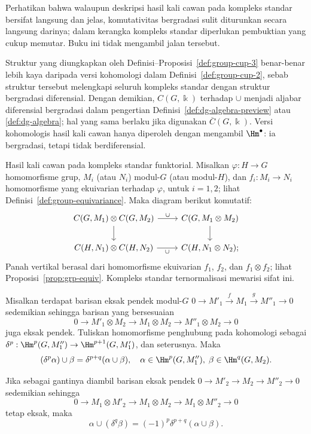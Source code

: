 Perhatikan bahwa walaupun deskripsi hasil kali cawan pada kompleks standar
bersifat langsung dan jelas, komutativitas bergradasi sulit diturunkan secara
langsung darinya; dalam kerangka kompleks standar diperlukan pembuktian yang
cukup memutar. Buku ini tidak mengambil jalan tersebut.

\begin{catatan}
	Struktur yang diungkapkan oleh Definisi--Proposisi~\ref{def:group-cup-3}
	benar-benar lebih kaya daripada versi kohomologi dalam
	Definisi~\ref{def:group-cup-2}, sebab struktur tersebut melengkapi seluruh
	kompleks standar dengan struktur bergradasi diferensial. Dengan demikian,
	$C(G,\Bbbk)$ terhadap $\cup$ menjadi aljabar diferensial bergradasi dalam
	pengertian Definisi~\ref{def:dg-algebra-preview} atau
	\ref{def:dg-algebra}; hal yang sama berlaku jika digunakan
	$\overline{C}(G,\Bbbk)$. Versi kohomologis hasil kali cawan hanya diperoleh
	dengan mengambil $\Hm^\bullet$: ia bergradasi, tetapi tidak berdiferensial.
\end{catatan}

Hasil kali cawan pada kompleks standar funktorial. Misalkan
$\varphi:H\to G$ homomorfisme grup, $M_i$ (atau $N_i$) modul-$G$ (atau
modul-$H$), dan $f_i:M_i\to N_i$ homomorfisme yang ekuivarian terhadap
$\varphi$, untuk $i=1,2$; lihat Definisi~\ref{def:group-equivariance}. Maka
diagram berikut komutatif:
\[\begin{tikzcd}
	C(G, M_1) \otimes C(G, M_2) \arrow[r, "\cup"] \arrow[d] & C(G, M_1 \otimes M_2) \arrow[d] \\
	C(H, N_1) \otimes C(H, N_2) \arrow[r, "\cup"'] & C(H, N_1 \otimes N_2);
\end{tikzcd}\]
Panah vertikal berasal dari homomorfisme ekuivarian $f_1$, $f_2$, dan
$f_1\otimes f_2$; lihat Proposisi~\ref{prop:grp-equiv}. Kompleks standar
ternormalisasi mewarisi sifat ini.

\begin{korolari}\label{prop:cup-ses}
	Misalkan terdapat barisan eksak pendek modul-$G$
	$0\to M'_1\xrightarrow{f}M_1\xrightarrow{g}M''_1\to0$ sedemikian sehingga
barisan yang bersesuaian
	\[ 0 \to M'_1 \otimes M_2 \to M_1 \otimes M_2 \to M''_1 \otimes M_2 \to 0 \]
	juga eksak pendek. Tuliskan homomorfisme penghubung pada kohomologi sebagai
	$\delta^p:\Hm^p(G,M''_1)\to\Hm^{p+1}(G,M'_1)$, dan seterusnya. Maka
	\[ (\delta^p \alpha) \cup \beta = \delta^{p+q}(\alpha \cup \beta), \quad \alpha \in \Hm^p(G, M''_1), \; \beta \in \Hm^q(G, M_2). \]

	Jika sebagai gantinya diambil barisan eksak pendek
	$0\to M'_2\to M_2\to M''_2\to0$ sedemikian sehingga
	\[ 0 \to M_1 \otimes M'_2 \to M_1 \otimes M_2 \to M_1 \otimes M''_2 \to 0 \]
	tetap eksak, maka
	\[ \alpha \cup (\delta^q \beta) = (-1)^p \delta^{p+q} (\alpha \cup \beta). \]
\end{korolari}

